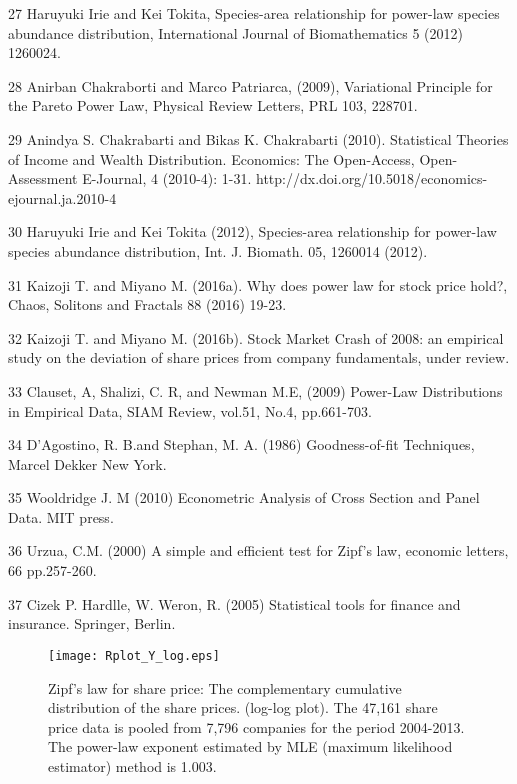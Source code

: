 \documentclass[10pt,a4paper]{article}
\begin{document}
\begin{thebibliography}{99a}
\item[27] Haruyuki Irie and Kei Tokita, Species-area relationship for power-law species abundance distribution, International Journal of Biomathematics 5 (2012) 1260024.

\item[28] Anirban Chakraborti and Marco Patriarca, (2009), Variational Principle for the Pareto Power Law, Physical Review Letters, PRL 103, 228701. 

\item[29] Anindya S. Chakrabarti and Bikas K. Chakrabarti (2010). Statistical Theories of Income and Wealth Distribution. Economics: The Open-Access, Open-Assessment E-Journal, 4 (2010-4): 1-31. 
http://dx.doi.org/10.5018/economics-ejournal.ja.2010-4

\item[30] Haruyuki Irie and Kei Tokita (2012), Species-area relationship for power-law species abundance distribution, Int. J. Biomath. 05, 1260014 (2012).  

\item[31] Kaizoji T. and Miyano M. (2016a). Why does power law for stock price hold?, Chaos, Solitons and Fractals 88 (2016) 19-23.

\item[32] Kaizoji T. and Miyano M. (2016b). Stock Market Crash of 2008: an empirical study on the deviation of share prices from company fundamentals, under review. 

\item[33] Clauset, A, Shalizi, C. R, and Newman M.E, (2009) Power-Law Distributions in Empirical Data, SIAM Review, vol.51, No.4, pp.661-703.

\item[34] D'Agostino, R. B.and Stephan, M. A. (1986) Goodness-of-fit Techniques, Marcel Dekker New York.

\item[35] Wooldridge J. M (2010) Econometric Analysis of Cross Section and Panel Data. MIT press.

\item[36] Urzua, C.M. (2000) A simple and efficient test for Zipf’s law, economic letters, 66 pp.257-260.

\item[37] Cizek P. Hardlle, W. Weron, R. (2005) Statistical tools for finance and insurance. Springer, Berlin.

\end{thebibliography} 

\begin{figure}[h]
\texttt{[image: Rplot\_Y\_log.eps]}\\
\caption{Zipf's law for share price: The complementary cumulative distribution of the share prices. (log-log plot). The 47,161 share price data is pooled from 7,796 companies for the period 2004-2013. The power-law exponent estimated by MLE (maximum likelihood estimator) method is 1.003.} 
\end{figure}
\end{document}
